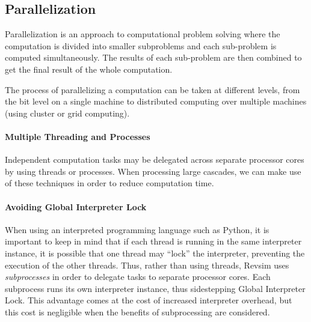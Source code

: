 \subsection{Parallelization}

Parallelization is an approach to computational problem solving where the computation is divided into smaller 
subproblems and each sub-problem is computed simultaneously. The results of each sub-problem are then combined 
to get the final result of the whole computation.

The process of parallelizing a computation can be taken at different levels, from the bit level on a single machine 
to distributed computing over multiple machines (using cluster or grid computing).

\paragraph{Multiple Threading and Processes} Independent computation tasks may be delegated across separate processor cores by using threads or processes. When processing large cascades, we can make use of these techniques in order to reduce computation time.

\paragraph{Avoiding Global Interpreter Lock} When using an interpreted programming language such as Python, it is important to keep in mind that if each thread is running in the same interpreter instance, it is possible that one thread may ``lock'' the interpreter, preventing the execution of the other threads. Thus, rather than using threads, Revsim uses \emph{subprocesses} in order to delegate tasks to separate processor cores. Each subprocess runs its own interpreter instance, thus sidestepping Global Interpreter Lock. This advantage comes at the cost of increased interpreter overhead, but this cost is negligible when the benefits of subprocessing are considered. 

